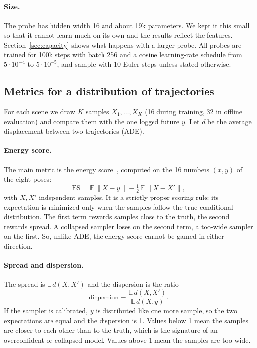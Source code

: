 \paragraph{Size.}
The probe has hidden width 16 and about 19k parameters. We kept it this small so
that it cannot learn much on its own and the results reflect the features.
Section~\ref{sec:capacity} shows what happens with a larger probe. All probes are
trained for 100k steps with batch 256 and a cosine learning-rate schedule from
$5\cdot10^{-4}$ to $5\cdot10^{-5}$, and sample with 10 Euler steps unless stated
otherwise.

\subsection{Metrics for a distribution of trajectories}
\label{sec:metrics}

For each scene we draw $K$ samples $X_1,\dots,X_K$ (16 during training, 32 in
offline evaluation) and compare them with the one logged future $y$. Let $d$ be
the average displacement between two trajectories (ADE).

\paragraph{Energy score.}
The main metric is the energy score~\cite{gneiting}, computed on the 16 numbers
$(x,y)$ of the eight poses:
\begin{equation}
\text{ES} = \mathbb{E}\,\lVert X - y\rVert - \tfrac12\,\mathbb{E}\,\lVert X - X'\rVert ,
\label{eq:energy}
\end{equation}
with $X, X'$ independent samples. It is a strictly proper scoring rule: its
expectation is minimized only when the samples follow the true conditional
distribution. The first term rewards samples close to the truth, the second
rewards spread. A collapsed sampler loses on the second term, a too-wide sampler
on the first. So, unlike ADE, the energy score cannot be gamed in either
direction.

\paragraph{Spread and dispersion.}
The spread is $\mathbb{E}\,d(X,X')$ and the dispersion is the ratio
\begin{equation}
\text{dispersion} = \frac{\mathbb{E}\,d(X,X')}{\mathbb{E}\,d(X,y)} .
\label{eq:dispersion}
\end{equation}
If the sampler is calibrated, $y$ is distributed like one more sample, so the
two expectations are equal and the dispersion is 1. Values below 1 mean the
samples are closer to each other than to the truth, which is the signature of an
overconfident or collapsed model. Values above 1 mean the samples are too wide.

